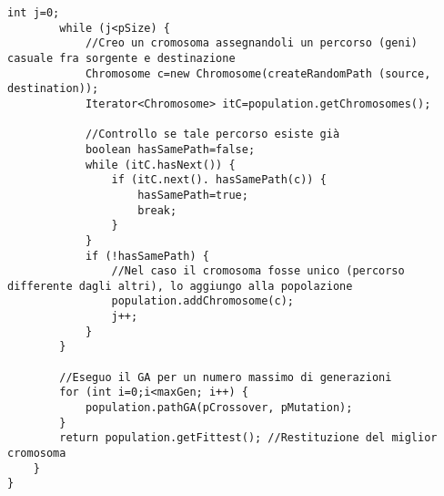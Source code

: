 \begin{lstlisting}[style=Java]
		int j=0;
		while (j<pSize) {
			//Creo un cromosoma assegnandoli un percorso (geni) casuale fra sorgente e destinazione
			Chromosome c=new Chromosome(createRandomPath (source, destination));
			Iterator<Chromosome> itC=population.getChromosomes();
			
			//Controllo se tale percorso esiste già
			boolean hasSamePath=false;
			while (itC.hasNext()) {
				if (itC.next(). hasSamePath(c)) {
					hasSamePath=true;
					break;
				}
			}
			if (!hasSamePath) {
				//Nel caso il cromosoma fosse unico (percorso differente dagli altri), lo aggiungo alla popolazione
				population.addChromosome(c);
				j++;
			}
		}
		
		//Eseguo il GA per un numero massimo di generazioni
		for (int i=0;i<maxGen; i++) {
			population.pathGA(pCrossover, pMutation);
		}
		return population.getFittest(); //Restituzione del miglior cromosoma
	}
}
\end{lstlisting}
